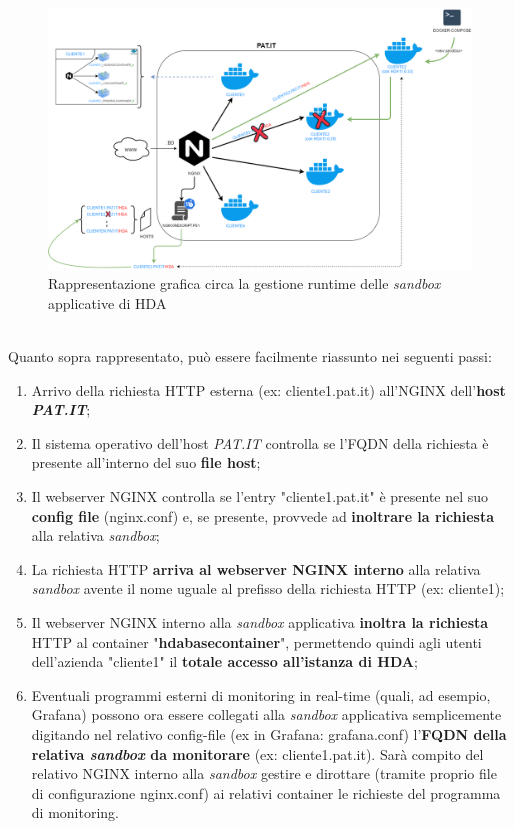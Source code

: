 \begin{figure}[!h]     
\centering 
    \includegraphics[width=1.0\columnwidth]{immagini/img/sandbox_nginx} 
    \caption{Rappresentazione grafica circa la gestione runtime delle \textit{sandbox} applicative di HDA}
\end{figure}\\
\newpage
Quanto sopra rappresentato, può essere facilmente riassunto nei seguenti passi:
\begin{enumerate}
	\item Arrivo della richiesta HTTP esterna (ex: cliente1.pat.it) all'NGINX dell'\textbf{host \textit{PAT.IT}};
	\item Il sistema operativo dell'host \textit{PAT.IT} controlla se l'FQDN della richiesta è presente all'interno del suo \textbf{file host};
	\item Il webserver NGINX controlla se l'entry "cliente1.pat.it" è presente nel suo \textbf{config file} (nginx.conf) e, se presente, provvede ad \textbf{inoltrare la richiesta} alla relativa \textit{sandbox};
	\item La richiesta HTTP \textbf{arriva al webserver NGINX interno} alla relativa \textit{sandbox} avente il nome uguale al prefisso della richiesta HTTP (ex: cliente1);
    	\item Il webserver NGINX interno alla \textit{sandbox} applicativa \textbf{inoltra la richiesta} HTTP al container "\textbf{hdabasecontainer}", permettendo quindi agli utenti dell'azienda "cliente1" il \textbf{totale accesso all'istanza di HDA};
	\item Eventuali programmi esterni di monitoring in real-time (quali, ad esempio, Grafana) possono ora essere collegati alla \textit{sandbox} applicativa semplicemente digitando nel relativo config-file (ex in Grafana: grafana.conf) l'\textbf{FQDN della relativa \textit{sandbox} da monitorare} (ex: cliente1.pat.it). Sarà compito del relativo NGINX interno alla \textit{sandbox} gestire e dirottare (tramite proprio file di configurazione nginx.conf) ai relativi container le richieste del programma di monitoring.
\end{enumerate}


